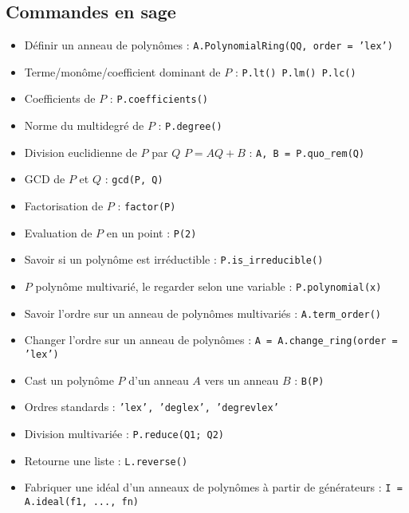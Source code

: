 \appendix
\chapter{}
    \section{Commandes en sage}
        \begin{itemize}
            \item Définir un anneau de polynômes : \texttt{A.PolynomialRing(QQ, order = 'lex')}
            \item Terme/monôme/coefficient dominant de $P$ : \texttt{P.lt() P.lm() P.lc()}
            \item Coefficients de $P$ : \texttt{P.coefficients()}
            \item Norme du multidegré de $P$ : \texttt{P.degree()}
            \item Division euclidienne de $P$ par $Q$ $P = AQ + B$ : \texttt{A, B = P.quo_rem(Q)}
            \item GCD de $P$ et $Q$ : \texttt{gcd(P, Q)}
            \item Factorisation de $P$ : \texttt{factor(P)}
            \item Evaluation de $P$ en un point : \texttt{P(2)}
            \item Savoir si un polynôme est irréductible : \texttt{P.is_irreducible()}
            \item $P$ polynôme multivarié, le regarder selon une variable : \texttt{P.polynomial(x)}
            \item Savoir l'ordre sur un anneau de polynômes multivariés : \texttt{A.term_order()}
            \item Changer l'ordre sur un anneau de polynômes : \texttt{A = A.change_ring(order = 'lex')}
            \item Cast un polynôme $P$ d'un anneau $A$ vers un anneau $B$ : \texttt{B(P)}
            \item Ordres standards : \texttt{'lex', 'deglex', 'degrevlex'}
            \item Division multivariée : \texttt{P.reduce(Q1; Q2)}
            \item Retourne une liste : \texttt{L.reverse()}
            \item Fabriquer une idéal d'un anneaux de polynômes à partir de générateurs : \texttt{I = A.ideal(f1, ..., fn)}

\end{itemize}
